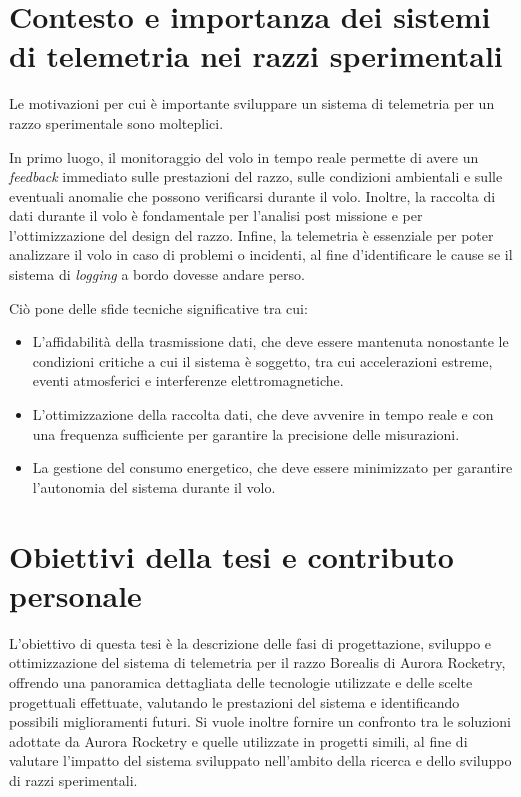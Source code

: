 \documentclass[12pt,a4paper,twoside]{book}
\begin{document}
\section{Contesto e importanza dei sistemi di telemetria nei razzi sperimentali}
Le motivazioni per cui \`e importante sviluppare un sistema di telemetria per un
razzo sperimentale sono molteplici.

In primo luogo, il monitoraggio del volo in tempo reale permette di avere un
\emph{feedback} immediato sulle prestazioni del razzo, sulle condizioni
ambientali e sulle eventuali anomalie che possono verificarsi durante il volo.
Inoltre, la raccolta di dati durante il volo \`e fondamentale per l’analisi
post missione e per l’ottimizzazione del design del razzo.
Infine, la telemetria \`e essenziale per poter analizzare il volo in caso di
problemi o incidenti, al fine d'identificare le cause se il sistema di
\emph{logging} a bordo dovesse andare perso.

Ciò pone delle sfide tecniche significative tra cui:
\begin{itemize}
    \item L'affidabilità della trasmissione dati, che deve essere mantenuta
          nonostante le condizioni critiche a cui il sistema è soggetto, tra cui
          accelerazioni estreme, eventi atmosferici e interferenze elettromagnetiche.
    \item L'ottimizzazione della raccolta dati, che deve avvenire in tempo reale
          e con una frequenza sufficiente per garantire la precisione delle misurazioni.
    \item La gestione del consumo energetico, che deve essere minimizzato per
          garantire l'autonomia del sistema durante il volo.
\end{itemize}

\section{Obiettivi della tesi e contributo personale}
L'obiettivo di questa tesi è la descrizione delle fasi di progettazione,
sviluppo e ottimizzazione del sistema di telemetria per il razzo Borealis di
Aurora Rocketry, offrendo una panoramica dettagliata delle tecnologie utilizzate
e delle scelte progettuali effettuate, valutando le prestazioni del sistema e
identificando possibili miglioramenti futuri.
Si vuole inoltre fornire un confronto tra le soluzioni adottate da Aurora
Rocketry e quelle utilizzate in progetti simili, al fine di valutare l'impatto
del sistema sviluppato nell'ambito della ricerca e dello sviluppo di razzi
sperimentali.
\end{document}
